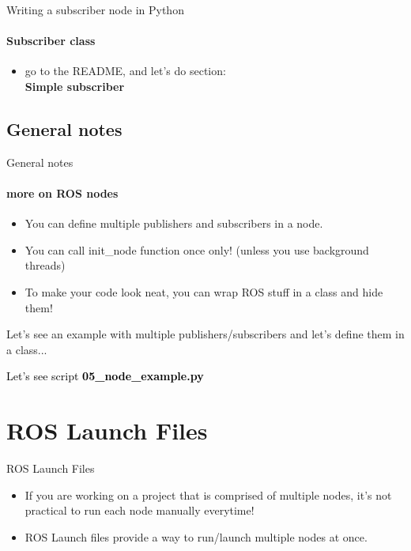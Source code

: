 \documentclass{beamer}
\begin{document}
\begin{frame}[fragile]{Writing a subscriber node in Python}
    \framesubtitle{Subscriber class}
    
    
    \begin{itemize}
        \centering
        \item go to the README, and let's do section:\\ 
        \textbf{Simple subscriber}
    \end{itemize} 
\end{frame}


\subsection{General notes}
\begin{frame}{General notes}
    \framesubtitle{more on ROS nodes}
    \begin{itemize}
        \item You can define multiple publishers and subscribers in a node.
        \item You can call {\ttfamily \colorbox{gray!30!white}{init\_node}} function once only! (unless you use background threads)
        \item To make your code look neat, you can wrap ROS stuff in a class and hide them!
    \end{itemize} 
    \vspace{0.5cm}
    Let's see an example with multiple publishers/subscribers and let's define them in a class...
\end{frame}


\begin{frame}[plain]{}  
    \centering
    {\huge \textcolor{black}{Let's see script \textbf{05\_node\_example.py}}}
\end{frame}




\section{ROS Launch Files}

\begin{frame}{ROS Launch Files}
    \begin{itemize}
        \item If you are working on a project that is comprised of multiple nodes, it's not practical to run each node manually everytime!
        \vspace{0.4cm}
        \item ROS Launch files provide a way to run/launch multiple nodes at once.
         
    \end{itemize}  
\end{frame}
\end{document}
